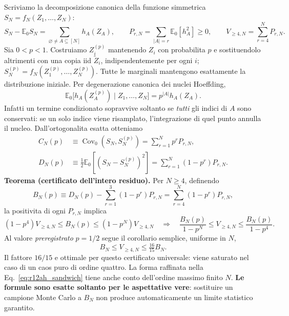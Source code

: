 \documentclass[11pt,a4paper]{article}
\begin{document}
Scriviamo la decomposizione canonica della funzione simmetrica $S_N=f_N(Z_1,\ldots,Z_N)$:
\begin{equation}
S_N-\mathbb E_0 S_N=\sum_{\varnothing\ne A\subseteq[N]} h_A(Z_A),\qquad
P_{r,N}=\sum_{|A|=r}\mathbb E_0[h_A^2]\ge0,\qquad
V_{\ge4,N}=\sum_{r=4}^N P_{r,N}.
\label{eq:r12ah_decomposition}
\end{equation}
Sia $0<p<1$. Costruiamo $Z_i^{(p)}$ mantenendo $Z_i$ con probabilita $p$ e sostituendolo altrimenti con una copia iid $\widetilde Z_i$, indipendentemente per ogni $i$; $S_N^{(p)}=f_N(Z_1^{(p)},\ldots,Z_N^{(p)})$. Tutte le marginali mantengono esattamente la distribuzione iniziale. Per degenerazione canonica dei nuclei Hoeffding,
\begin{equation}
 \mathbb E_0\bigl[h_A(Z_A^{(p)})\mid Z_1,\ldots,Z_N\bigr]=p^{|A|}h_A(Z_A).
 \label{eq:r12ah_operator}
\end{equation}
Infatti un termine condizionato sopravvive soltanto se \emph{tutti} gli indici di $A$ sono conservati: se un solo indice viene risamplato, l'integrazione di quel punto annulla il nucleo. Dall'ortogonalita esatta otteniamo
\begin{align}
 C_N(p)&\equiv\operatorname{Cov}_0(S_N,S_N^{(p)})=\sum_{r=1}^N p^r P_{r,N},\label{eq:r12ah_cov}\\
 D_N(p)&\equiv\tfrac12\mathbb E_0[(S_N-S_N^{(p)})^2]=\sum_{r=1}^N(1-p^r)P_{r,N}.\label{eq:r12ah_D}
\end{align}
\textbf{Teorema (certificato dell'intero residuo).} Per $N\ge4$, definendo
\begin{equation}
 B_N(p)\equiv D_N(p)-\sum_{r=1}^3(1-p^r)P_{r,N}
 =\sum_{r=4}^N(1-p^r)P_{r,N},
 \label{eq:r12ah_B}
\end{equation}
la positivita di ogni $P_{r,N}$ implica
\begin{equation}
 \boxed{(1-p^4)V_{\ge4,N}\le B_N(p)\le(1-p^N)V_{\ge4,N}}
 \quad\Longrightarrow\quad
 \boxed{\frac{B_N(p)}{1-p^N}\le V_{\ge4,N}\le\frac{B_N(p)}{1-p^4}}.
 \label{eq:r12ah_sandwich}
\end{equation}
Al valore \emph{preregistrato} $p=1/2$ segue il corollario semplice, uniforme in $N$,
\begin{equation}
 \boxed{B_N\le V_{\ge4,N}\le\tfrac{16}{15} B_N}.\label{eq:r12ah_half}
\end{equation}
Il fattore $16/15$ e ottimale per questo certificato universale: viene saturato nel caso di un caos puro di ordine quattro. La forma raffinata nella Eq.~\eqref{eq:r12ah_sandwich} tiene anche conto dell'ordine massimo finito $N$. \textbf{Le formule sono esatte soltanto per le aspettative vere}: sostituire un campione Monte Carlo a $B_N$ non produce automaticamente un limite statistico garantito.
\end{document}
